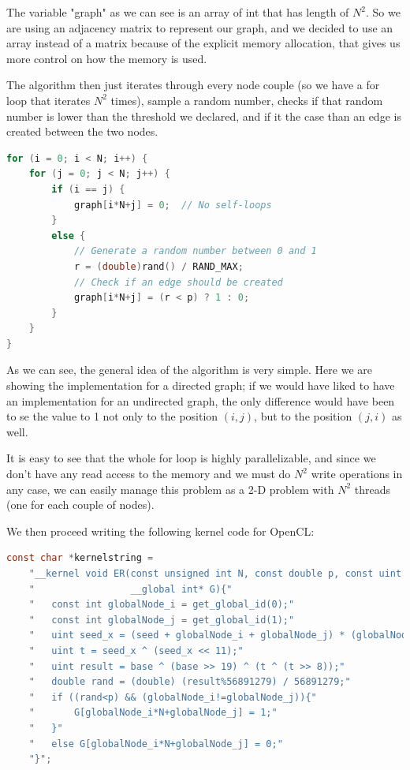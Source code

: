\documentclass[titlepage]{article}
\begin{document}
The variable "graph" as we can see is an array of int that has length of $N^2$. So we are using an adjacency matrix to represent our graph, and we decided  to use an array instead of a matrix because of the explicit memory allocation, that gives us more control on how the memory is used.

The algorithm then just iterates through every node couple (so we have a for loop that iterates $N^2$ times), sample a random number, checks if that random number is lower than the threshold we declared, and if it the case than an edge is created between the two nodes.

\begin{minipage}{\linewidth}
\begin{lstlisting}[language=C, style=customc, breaklines=true]
for (i = 0; i < N; i++) {
    for (j = 0; j < N; j++) {
        if (i == j) {
            graph[i*N+j] = 0;  // No self-loops
        }
        else {
            // Generate a random number between 0 and 1
            r = (double)rand() / RAND_MAX;
            // Check if an edge should be created
            graph[i*N+j] = (r < p) ? 1 : 0;
        }
    }
}
\end{lstlisting}
\end{minipage}

As we can see, the general idea of the algorithm is very simple. Here we are showing the implementation for a directed graph; if we would have liked to have an implementation for an undirected graph, the only difference would have been to se the value to 1 not only to the position $(i,j)$, but to the position $(j,i)$ as well.

It is easy to see that the whole for loop is highly parallelizable, and since we don't have any read access to the memory and we must do $N^2$ write operations in any case, we can easily manage this problem as a 2-D problem with $N^2$ threads (one for each couple of nodes).

We then proceed writing the following kernel code for OpenCL:

\begin{minipage}{\linewidth}
\begin{lstlisting}[language=C, style=customc, breaklines=true]
const char *kernelstring =
    "__kernel void ER(const unsigned int N, const double p, const uint seed, const uint base,"
    "                 __global int* G){"
    "   const int globalNode_i = get_global_id(0);"
    "   const int globalNode_j = get_global_id(1);"
    "   uint seed_x = (seed + globalNode_i + globalNode_j) * (globalNode_i + 1) << globalNode_i;"
    "   uint t = seed_x ^ (seed_x << 11);"
    "   uint result = base ^ (base >> 19) ^ (t ^ (t >> 8));"
    "   double rand = (double) (result%56891279) / 56891279;"
    "   if ((rand<p) && (globalNode_i!=globalNode_j)){"
    "       G[globalNode_i*N+globalNode_j] = 1;"
    "   }"
    "   else G[globalNode_i*N+globalNode_j] = 0;"
    "}";
\end{lstlisting}
\end{minipage}
\end{document}
